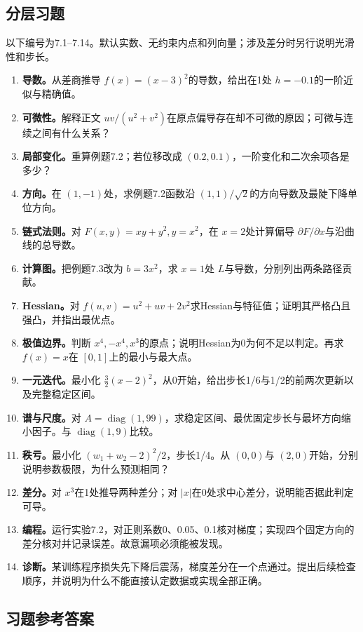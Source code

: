 \documentclass[UTF8,fontset=none,zihao=-4,a4paper]{ctexart}
\numberwithin{equation}{section}
\numberwithin{figure}{section}
\begin{document}
\subsection{分层习题}
以下编号为7.1--7.14。默认实数、无约束内点和列向量；涉及差分时另行说明光滑性和步长。
\begin{enumerate}[label=\textbf{7.\arabic*}]
\item \textbf{导数。}从差商推导 $f(x)=(x-3)^2$的导数，给出在1处 $h=-0.1$的一阶近似与精确值。
\item \textbf{可微性。}解释正文 $uv/(u^2+v^2)$在原点偏导存在却不可微的原因；可微与连续之间有什么关系？
\item \textbf{局部变化。}重算例题7.2；若位移改成 $(0.2,0.1)$，一阶变化和二次余项各是多少？
\item \textbf{方向。}在 $(1,-1)$处，求例题7.2函数沿 $(1,1)/\sqrt2$的方向导数及最陡下降单位方向。
\item \textbf{链式法则。}对 $F(x,y)=xy+y^2,y=x^2$，在 $x=2$处计算偏导 $\partial F/\partial x$与沿曲线的总导数。
\item \textbf{计算图。}把例题7.3改为 $b=3x^2$，求 $x=1$处 $L$与导数，分别列出两条路径贡献。
\item \textbf{Hessian。}对 $f(u,v)=u^2+uv+2v^2$求Hessian与特征值；证明其严格凸且强凸，并指出最优点。
\item \textbf{极值边界。}判断 $x^4,-x^4,x^3$的原点；说明Hessian为0为何不足以判定。再求 $f(x)=x$在 $[0,1]$上的最小与最大点。
\item \textbf{一元迭代。}最小化 $\frac32(x-2)^2$，从0开始，给出步长1/6与1/2的前两次更新以及完整稳定区间。
\item \textbf{谱与尺度。}对 $A=\operatorname{diag}(1,99)$，求稳定区间、最优固定步长与最坏方向缩小因子。与 $\operatorname{diag}(1,9)$比较。
\item \textbf{秩亏。}最小化 $(w_1+w_2-2)^2/2$，步长1/4。从 $(0,0)$与 $(2,0)$开始，分别说明参数极限，为什么预测相同？
\item \textbf{差分。}对 $x^3$在1处推导两种差分；对 $|x|$在0处求中心差分，说明能否据此判定可导。
\item \textbf{编程。}运行实验7.2，对正则系数0、0.05、0.1核对梯度；实现四个固定方向的差分核对并记录误差。故意漏项必须能被发现。
\item \textbf{诊断。}某训练程序损失先下降后震荡，梯度差分在一个点通过。提出后续检查顺序，并说明为什么不能直接认定数据或实现全部正确。
\end{enumerate}

\clearpage
\subsection{习题参考答案}
\end{document}
